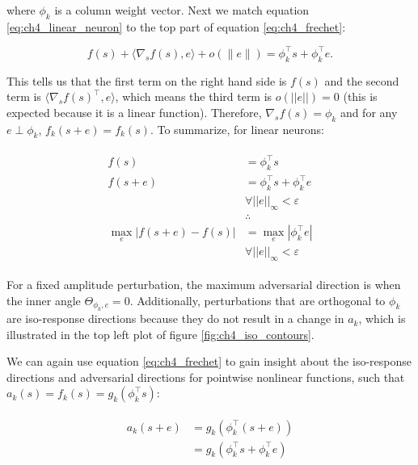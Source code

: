 where $\phi_{k}$ is a column weight vector. Next we match equation \eqref{eq:ch4_linear_neuron} to the top part of equation \eqref{eq:ch4_frechet}:

\begin{equation}
    f(s) + \langle\nabla_{s}f(s), e\rangle + o(\|e\|) = \phi_{k}^\top s + \phi_{k}^\top e.
\end{equation}

This tells us that the first term on the right hand side is $f(s)$ and the second term is $\langle\nabla_{s}f(s)^\top, e\rangle$, which means the third term is $o(||e||)=0$ (this is expected because it is a linear function). Therefore,  $\nabla_{s}f(s) = \phi_{k}$ and for any $e \perp \phi_{k}$, $f_{k}(s+e) = f_{k}(s)$. To summarize, for linear neurons:

\begin{align}\label{eq:parallel_adv_proof}
\begin{split}
    f(s) &= \phi_{k}^\top s \\
    f(s+e) &= \phi_{k}^\top s + \phi_{k}^\top e \\
    &\forall ||e||_{\infty} < \varepsilon \\
    &\therefore \\
    \max_{e} | f(s+e) - f(s) | &= \max_{e} | \phi_{k}^\top e | \\
    & \forall ||e||_{\infty} < \varepsilon
\end{split}
\end{align}

For a fixed amplitude perturbation, the maximum adversarial direction is when the inner angle $\Theta_{\phi_{k},e} = 0$. Additionally, perturbations that are orthogonal to $\phi_{k}$ are iso-response directions because they do not result in a change in $a_{k}$, which is illustrated in the top left plot of figure \ref{fig:ch4_iso_contours}.

We can again use equation \eqref{eq:ch4_frechet} to gain insight about the iso-response directions and adversarial directions for pointwise nonlinear functions, such that $a_{k}(s) = f_{k}(s) = g_{k}(\phi_{k}^\top s)$:

\begin{align}\label{eq:ch4_pw_nonlin}
\begin{split}
  a_{k}(s+e) &= g_{k}(\phi_{k}^\top(s+e)) \\
  &=g_{k}(\phi_{k}^\top s + \phi_{k}^\top e) \\
\end{split}
\end{align}

